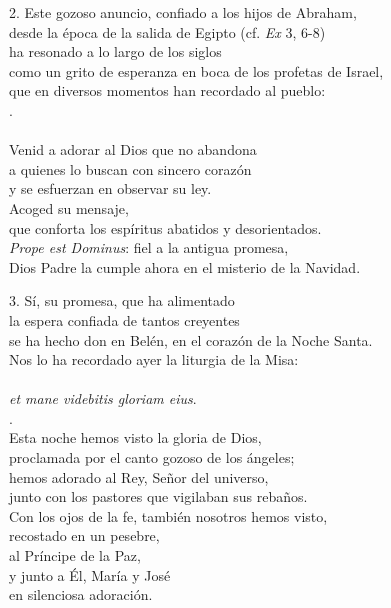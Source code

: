 2. Este gozoso anuncio, confiado a los hijos de Abraham,\\ desde la época de la salida de Egipto (cf. \emph{Ex} 3, 6-8)\\ ha resonado a lo largo de los siglos\\ como un grito de esperanza en boca de los profetas de Israel,\\ que en diversos momentos han recordado al pueblo:\\ \emph{}.\\ \\ Venid a adorar al Dios que no abandona\\ a quienes lo buscan con sincero corazón\\ y se esfuerzan en observar su ley.\\ Acoged su mensaje,\\ que conforta los espíritus abatidos y desorientados.\\ \emph{Prope est Dominus}: fiel a la antigua promesa,\\ Dios Padre la cumple ahora en el misterio de la Navidad.

3. Sí, su promesa, que ha alimentado\\ la espera confiada de tantos creyentes\\ se ha hecho don en Belén, en el corazón de la Noche Santa.\\ Nos lo ha recordado ayer la liturgia de la Misa:\\ \emph{\\ et mane videbitis gloriam eius}.\\ .\\ Esta noche hemos visto la gloria de Dios,\\ proclamada por el canto gozoso de los ángeles;\\ hemos adorado al Rey, Señor del universo,\\ junto con los pastores que vigilaban sus rebaños.\\ Con los ojos de la fe, también nosotros hemos visto,\\ recostado en un pesebre,\\ al Príncipe de la Paz,\\ y junto a Él, María y José\\ en silenciosa adoración.

